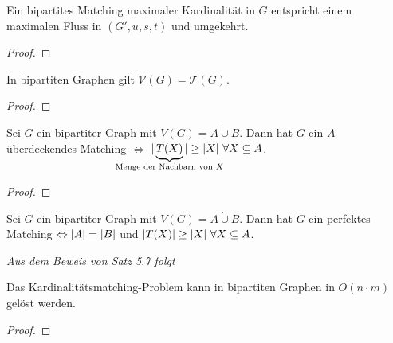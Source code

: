 \begin{satz}
	Ein bipartites Matching maximaler Kardinalität in $G$ entspricht einem maximalen Fluss in $(G',u,s,t)$ und umgekehrt.
\end{satz}
\begin{proof}
	
\end{proof}
\begin{satz}
	In bipartiten Graphen gilt $\mathcal{V}(G) = \mathcal{T}(G)$.
\end{satz}
\begin{proof}
	
\end{proof}
\begin{satz}
	Sei $G$ ein bipartiter Graph mit $V(G)=A\dot\cup B$. Dann hat $G$ ein $A$ überdeckendes Matching $\Leftrightarrow$ $\card{\underbrace{T(X)}_{\mathclap{\text{Menge der Nachbarn von } X}}} \ge \card{X}~\forall X\subseteq A$.
\end{satz}
\begin{proof}
	
\end{proof}
\begin{korollar}
	Sei $G$ ein bipartiter Graph mit $V(G) = A\dot\cup B$. Dann hat $G$ ein perfektes Matching $\Leftrightarrow \vert A \vert=\vert B \vert$ und $\vert T(X) \vert \ge \vert X \vert~\forall X \subseteq A$.
\end{korollar}
\textit{Aus dem Beweis von Satz 5.7 folgt}
\begin{korollar}
	Das Kardinalitätsmatching-Problem kann in bipartiten Graphen in $O(n\cdot m)$ gelöst werden.
\end{korollar}
\begin{proof}
	
\end{proof}